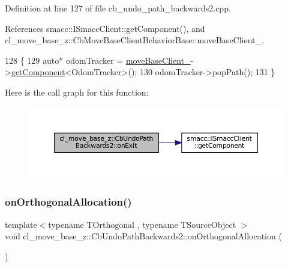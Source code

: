 Definition at line 127 of file cb\+\_\+undo\+\_\+path\+\_\+backwards2.\+cpp.



References smacc\+::\+I\+Smacc\+Client\+::get\+Component(), and cl\+\_\+move\+\_\+base\+\_\+z\+::\+Cb\+Move\+Base\+Client\+Behavior\+Base\+::move\+Base\+Client\+\_\+.


\begin{DoxyCode}
128 \{
129   \textcolor{keyword}{auto}* odomTracker = \hyperlink{classcl__move__base__z_1_1CbMoveBaseClientBehaviorBase_ab2ef219464cfac8659b4a87c8d0db6d5}{moveBaseClient\_}->\hyperlink{classsmacc_1_1ISmaccClient_adef78db601749ca63c19e74a27cb88cc}{getComponent}<OdomTracker>();
130   odomTracker->popPath();
131 \}
\end{DoxyCode}
Here is the call graph for this function\+:
\nopagebreak
\begin{figure}[H]
\begin{center}
\leavevmode
\includegraphics[width=350pt]{classcl__move__base__z_1_1CbUndoPathBackwards2_ae493fcd813176d8473ff08680beb7afe_cgraph}
\end{center}
\end{figure}
\mbox{\label{classcl__move__base__z_1_1CbUndoPathBackwards2_a61148b9509b489efc382ecdeb9bcf9c2}} 
\subsubsection{\texorpdfstring{on\+Orthogonal\+Allocation()}{onOrthogonalAllocation()}}
{\footnotesize\ttfamily template$<$typename T\+Orthogonal , typename T\+Source\+Object $>$ \\
void cl\+\_\+move\+\_\+base\+\_\+z\+::\+Cb\+Undo\+Path\+Backwards2\+::on\+Orthogonal\+Allocation (\begin{DoxyParamCaption}{ }\end{DoxyParamCaption})\hspace{0.3cm}{\ttfamily [inline]}}




